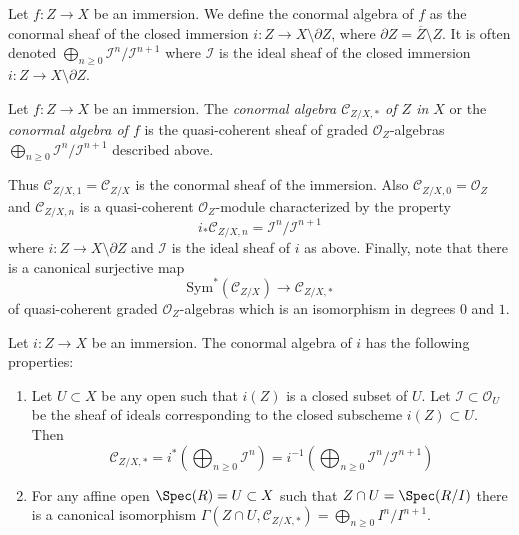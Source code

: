 \medskip\noindent
Let $f : Z \to X$ be an immersion. We define the conormal algebra of $f$
as the conormal sheaf of the closed immersion
$i : Z \to X \setminus \partial Z$, where
$\partial Z = \overline{Z} \setminus Z$. It is often denoted
$\bigoplus_{n \geq 0} \mathcal{I}^n/\mathcal{I}^{n + 1}$
where $\mathcal{I}$ is the ideal sheaf
of the closed immersion $i : Z \to X \setminus \partial Z$.

\begin{definition}
\label{definition-conormal-sheaf}
Let $f : Z \to X$ be an immersion. The {\it conormal algebra
$\mathcal{C}_{Z/X, *}$ of $Z$ in $X$} or the {\it conormal algebra of $f$}
is the quasi-coherent sheaf of graded $\mathcal{O}_Z$-algebras
$\bigoplus_{n \geq 0} \mathcal{I}^n/\mathcal{I}^{n + 1}$ described above.
\end{definition}

\noindent
Thus $\mathcal{C}_{Z/X, 1} = \mathcal{C}_{Z/X}$ is the conormal sheaf
of the immersion. Also $\mathcal{C}_{Z/X, 0} = \mathcal{O}_Z$ and
$\mathcal{C}_{Z/X, n}$ is a quasi-coherent $\mathcal{O}_Z$-module
characterized by the property
\begin{equation}
\label{equation-conormal-in-degree-n}
i_*\mathcal{C}_{Z/X, n} = \mathcal{I}^n/\mathcal{I}^{n + 1}
\end{equation}
where $i : Z \to X \setminus \partial Z$ and $\mathcal{I}$ is the ideal
sheaf of $i$ as above. Finally, note that there is a canonical surjective
map
\begin{equation}
\label{equation-conormal-algebra-quotient}
\text{Sym}^*(\mathcal{C}_{Z/X}) \longrightarrow \mathcal{C}_{Z/X, *}
\end{equation}
of quasi-coherent graded $\mathcal{O}_Z$-algebras which is an isomorphism
in degrees $0$ and $1$.

\begin{lemma}
\label{lemma-affine-conormal-sheaf}
Let $i : Z \to X$ be an immersion. The conormal algebra
of $i$ has the following properties:
\begin{enumerate}
\item Let $U \subset X$ be any open such that $i(Z)$ is
a closed subset of $U$. Let $\mathcal{I} \subset \mathcal{O}_U$
be the sheaf of ideals corresponding to the closed subscheme
$i(Z) \subset U$. Then
$$
\mathcal{C}_{Z/X, *} =
i^*\left(\bigoplus\nolimits_{n \geq 0} \mathcal{I}^n\right) =
i^{-1}\left(
\bigoplus\nolimits_{n \geq 0} \mathcal{I}^n/\mathcal{I}^{n + 1}
\right)
$$
\item
For any affine open $\Spec(R) = U \subset X$
such that $Z \cap U = \Spec(R/I)$ there is a
canonical isomorphism
$\Gamma(Z \cap U, \mathcal{C}_{Z/X, *}) = \bigoplus_{n \geq 0} I^n/I^{n + 1}$.
\end{enumerate}
\end{lemma}

